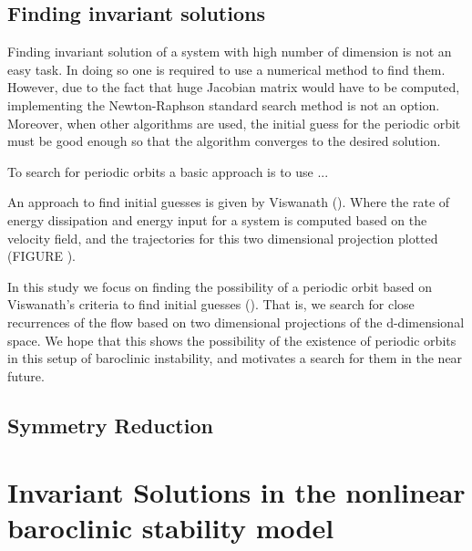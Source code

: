 \subsection{Finding invariant solutions}

Finding invariant solution of a system with high number of dimension is not an easy task. In doing so one is required to use a numerical method to find them. However, due to the fact that huge Jacobian matrix would have to be computed, implementing the Newton-Raphson standard search method is not an option. Moreover, when other algorithms are used, the initial guess for the periodic orbit must be good enough so that the algorithm converges to the desired solution.

To search for periodic orbits a basic approach is to use ... 

An approach to find initial guesses is given by Viswanath (). Where the rate of energy dissipation and energy input for a system is computed based on the velocity field, and the trajectories for this two dimensional projection plotted (FIGURE ).

In this study we focus on finding the possibility of a periodic orbit based on Viswanath's criteria to find initial guesses (). That is, we search for close recurrences of the flow based on two dimensional projections of the d-dimensional space. We hope that this shows the possibility of the existence of periodic orbits in this setup of baroclinic instability, and motivates a search for them in the near future.

\subsection{Symmetry Reduction}

\section{Invariant Solutions in the nonlinear baroclinic stability model}
\label{s:model}
